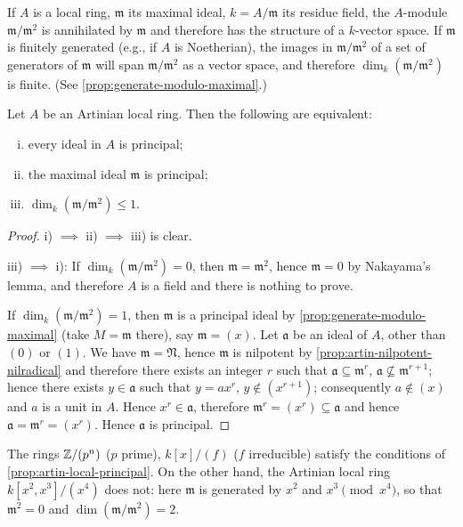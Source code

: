 If $A$ is a local ring, $\mathfrak{m}$ its maximal ideal, $k = A/\mathfrak{m}$ its residue field, the $A$-module $\mathfrak{m}/\mathfrak{m}^2$ is annihilated by $\mathfrak{m}$ and therefore has the structure of a $k$-vector space. If $\mathfrak{m}$ is finitely generated (e.g., if $A$ is Noetherian), the images in $\mathfrak{m}/\mathfrak{m}^2$ of a set of generators of $\mathfrak{m}$ will span $\mathfrak{m}/\mathfrak{m}^2$ as a vector space, and therefore $\dim_k(\mathfrak{m}/\mathfrak{m}^2)$ is finite. (See \eqref{prop:generate-modulo-maximal}.)

\begin{proposition}\label{prop:artin-local-principal}
Let $A$ be an Artinian local ring. Then the following are equivalent:
\begin{enumerate}[i)]
    \item every ideal in $A$ is principal;
    \item the maximal ideal $\mathfrak{m}$ is principal;
    \item $\dim_k(\mathfrak{m}/\mathfrak{m}^2) \leq 1$.
\end{enumerate}
\end{proposition}

\begin{proof}
i) $\implies$ ii) $\implies$ iii) is clear.

iii) $\implies$ i): If $\dim_k(\mathfrak{m}/\mathfrak{m}^2) = 0$, then $\mathfrak{m} = \mathfrak{m}^2$, hence $\mathfrak{m} = 0$ by Nakayama's lemma, and therefore $A$ is a field and there is nothing to prove.

If $\dim_k(\mathfrak{m}/\mathfrak{m}^2) = 1$, then $\mathfrak{m}$ is a principal ideal by \eqref{prop:generate-modulo-maximal} (take $M = \mathfrak{m}$ there), say $\mathfrak{m} = (x)$. Let $\mathfrak{a}$ be an ideal of $A$, other than $(0)$ or $(1)$. We have $\mathfrak{m} = \mathfrak{N}$, hence $\mathfrak{m}$ is nilpotent by \eqref{prop:artin-nilpotent-nilradical} and therefore there exists an integer $r$ such that $\mathfrak{a} \subseteq \mathfrak{m}^r$, $\mathfrak{a} \not\subseteq \mathfrak{m}^{r+1}$; hence there exists $y \in \mathfrak{a}$ such that $y = ax^r$, $y \notin (x^{r+1})$; consequently $a \notin (x)$ and $a$ is a unit in $A$. Hence $x^r \in \mathfrak{a}$, therefore $\mathfrak{m}^r = (x^r) \subseteq \mathfrak{a}$ and hence $\mathfrak{a} = \mathfrak{m}^r = (x^r)$. Hence $\mathfrak{a}$ is principal.
\end{proof}

\begin{example}
The rings $\mathbb{Z}/(p^n)$ ($p$ prime), $k[x]/(f)$ ($f$ irreducible) satisfy the conditions of \eqref{prop:artin-local-principal}. On the other hand, the Artinian local ring $k[x^2, x^3]/(x^4)$ does not: here $\mathfrak{m}$ is generated by $x^2$ and $x^3 \pmod{x^4}$, so that $\mathfrak{m}^2 = 0$ and $\dim(\mathfrak{m}/\mathfrak{m}^2) = 2$.
\end{example}


